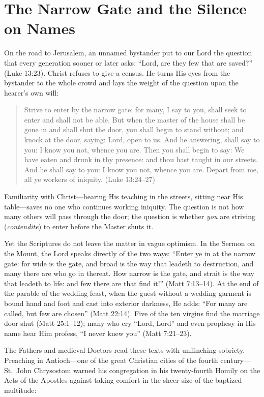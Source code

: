 \section{The Narrow Gate and the Silence on Names}

On the road to Jerusalem, an unnamed bystander put to our Lord the question that every generation sooner or later asks: ``Lord, are they few that are saved?'' (Luke 13:23). Christ refuses to give a census. He turns His eyes from the bystander to the whole crowd and lays the weight of the question upon the hearer's own will:

\begin{quote}
Strive to enter by the narrow gate: for many, I say to you, shall seek to enter and shall not be able. But when the master of the house shall be gone in and shall shut the door, you shall begin to stand without; and knock at the door, saying: Lord, open to us. And he answering, shall say to you: I know you not, whence you are. Then you shall begin to say: We have eaten and drunk in thy presence: and thou hast taught in our streets. And he shall say to you: I know you not, whence you are. Depart from me, all ye workers of iniquity. (Luke 13:24--27)
\end{quote}

Familiarity with Christ---hearing His teaching in the streets, sitting near His table---saves no one who continues working iniquity. The question is not how many others will pass through the door; the question is whether \textit{you} are striving (\textit{contendite}) to enter before the Master shuts it.

Yet the Scriptures do not leave the matter in vague optimism. In the Sermon on the Mount, the Lord speaks directly of the two ways: ``Enter ye in at the narrow gate: for wide is the gate, and broad is the way that leadeth to destruction, and many there are who go in thereat. How narrow is the gate, and strait is the way that leadeth to life: and few there are that find it!'' (Matt 7:13--14). At the end of the parable of the wedding feast, when the guest without a wedding garment is bound hand and foot and cast into exterior darkness, He adds: ``For many are called, but few are chosen'' (Matt 22:14). Five of the ten virgins find the marriage door shut (Matt 25:1--12); many who cry ``Lord, Lord'' and even prophesy in His name hear Him profess, ``I never knew you'' (Matt 7:21--23).

The Fathers and medieval Doctors read these texts with unflinching sobriety. Preaching in Antioch---one of the great Christian cities of the fourth century---St.\ John Chrysostom warned his congregation in his twenty-fourth Homily on the Acts of the Apostles against taking comfort in the sheer size of the baptized multitude:

